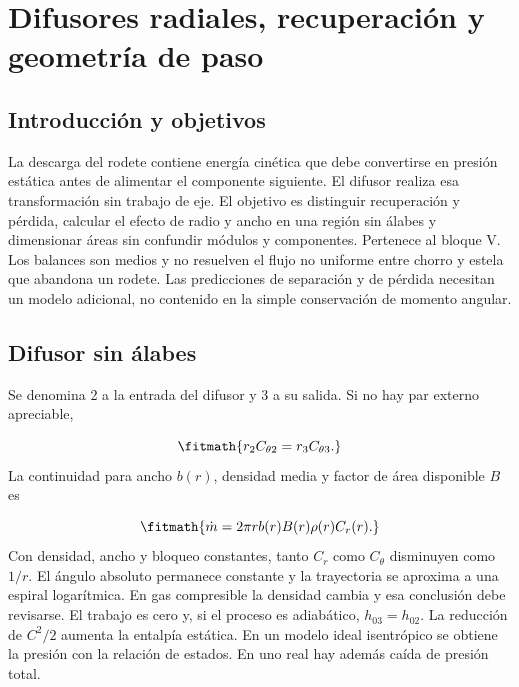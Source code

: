 \documentclass[10pt,openany]{book}
\begin{document}
\studiumchaptercheck

\chapter{Difusores radiales, recuperación y geometría de paso}
\label{chap:c16}


\section{Introducción y objetivos}

La descarga del rodete contiene energía cinética que debe convertirse en presión estática antes de alimentar el componente siguiente. El difusor realiza esa transformación sin trabajo de eje. El objetivo es distinguir recuperación y pérdida, calcular el efecto de radio y ancho en una región sin álabes y dimensionar áreas sin confundir módulos y componentes. Pertenece al bloque V.
Los balances son medios y no resuelven el flujo no uniforme entre chorro y estela que abandona un rodete. Las predicciones de separación y de pérdida necesitan un modelo adicional, no contenido en la simple conservación de momento angular.

\section{Difusor sin álabes}

Se denomina 2 a la entrada del difusor y 3 a su salida. Si no hay par externo apreciable,

\[
\fitmath{r_2C_{\theta2}=r_3C_{\theta3}.}
\]
La continuidad para ancho \(b(r)\), densidad media y factor de área disponible \(B\) es

\[
\fitmath{\dot m=2\pi r b(r)B(r)\rho(r)C_r(r).}
\]
Con densidad, ancho y bloqueo constantes, tanto \(C_r\) como \(C_\theta\) disminuyen como \(1/r\). El ángulo absoluto permanece constante y la trayectoria se aproxima a una espiral logarítmica. En gas compresible la densidad cambia y esa conclusión debe revisarse.
El trabajo es cero y, si el proceso es adiabático, \(h_{03}=h_{02}\). La reducción de \(C^2/2\) aumenta la entalpía estática. En un modelo ideal isentrópico se obtiene la presión con la relación de estados. En uno real hay además caída de presión total.
\end{document}
